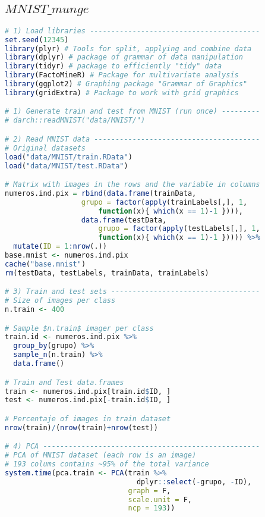 \subsection{$MNIST\_munge$}
\begin{lstlisting}[language=R, basicstyle=\small]
# 1) Load libraries ----------------------------------------
set.seed(12345)
library(plyr) # Tools for split, applying and combine data
library(dplyr) # package of grammar of data manipulation
library(tidyr) # package to efficiently "tidy" data
library(FactoMineR) # Package for multivariate analysis
library(ggplot2) # Graphing package "Grammar of Graphics"
library(gridExtra) # Package to work with grid graphics

# 1) Generate train and test from MNIST (run once) ---------
# darch::readMNIST("data/MNIST/")

# 2) Read MNIST data ---------------------------------------
# Original datasets
load("data/MNIST/train.RData")
load("data/MNIST/test.RData")

# Matrix with images in the rows and the variable in columns
numeros.ind.pix = rbind(data.frame(trainData, 
                  grupo = factor(apply(trainLabels[,], 1,  
                      function(x){ which(x == 1)-1 }))),
                  data.frame(testData, 
                      grupo = factor(apply(testLabels[,], 1,  
                      function(x){ which(x == 1)-1 })))) %>% 
  mutate(ID = 1:nrow(.))
base.mnist <- numeros.ind.pix
cache("base.mnist")
rm(testData, testLabels, trainData, trainLabels)

# 3) Train and test sets -----------------------------------
# Size of images per class
n.train <- 400

# Sample $n.train$ imager per class
train.id <- numeros.ind.pix %>% 
  group_by(grupo) %>% 
  sample_n(n.train) %>% 
  data.frame()

# Train and Test data.frames                    
train <- numeros.ind.pix[train.id$ID, ]
test <- numeros.ind.pix[-train.id$ID, ]

# Percentaje of images in train dataset
nrow(train)/(nrow(train)+nrow(test))

# 4) PCA ---------------------------------------------------
# PCA of MNIST dataset (each row is an image)
# 193 colums contains ~95% of the total variance
system.time(pca.train <- PCA(train %>% 
                               dplyr::select(-grupo, -ID), 
                             graph = F,
                             scale.unit = F,
                             ncp = 193))


\end{lstlisting}
